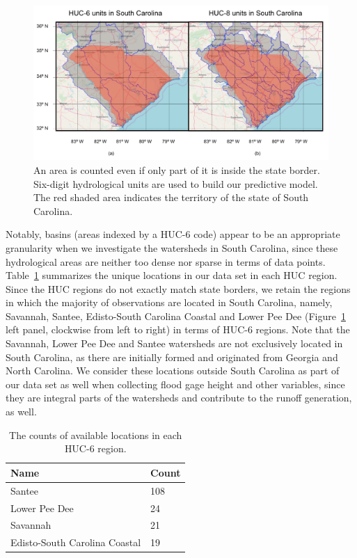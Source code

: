 \documentclass{svjour3}
\renewcommand\hl[1]{#1}
\begin{document}
\begin{figure}[htbp]
\includegraphics[width=1\textwidth]{../images/huc_units_in_sc.png}
\caption{\hl{An area is counted even if only part of it is inside the state border. Six-digit hydrological units are used to build our predictive model. The red shaded area indicates the territory of the state of South Carolina.}}
\label{fig:size_comp}
\end{figure}

Notably, basins (areas indexed by a \hl{HUC-6} code) appear to be an appropriate granularity when we investigate the watersheds in South Carolina, since these hydrological areas are neither too dense nor sparse in terms of data points.
Table~\ref{fig:real_huc} summarizes the unique locations in our data set in each HUC region.
Since the HUC regions do not exactly match state borders, we retain the regions in which the majority of observations are located in South Carolina, namely, Savannah, Santee, Edisto-South Carolina Coastal and Lower Pee Dee (Figure~\ref{fig:size_comp} left panel, clockwise from left to right) in terms of HUC-6 regions.
 Note that the Savannah,  Lower Pee Dee and Santee watersheds are not exclusively located in South Carolina, as there are initially formed and originated from Georgia and North Carolina.
 We consider these locations outside South Carolina as part of our data set as well when collecting flood gage height and other variables, since they are integral parts of the watersheds and contribute to the runoff generation, as well.\\

\begin{table}[htbp]
\centering
\begin{tabular}{|l|l|}
\hline
Name & Count\\\hline
Santee & 108\\\hline
Lower Pee Dee&24\\ \hline
Savannah & 21\\ \hline
Edisto-South Carolina Coastal &19\\ \hline
\end{tabular}
\caption{The counts of available locations in each HUC-6 region. }
\label{fig:real_huc}
\end{table}
\end{document}
